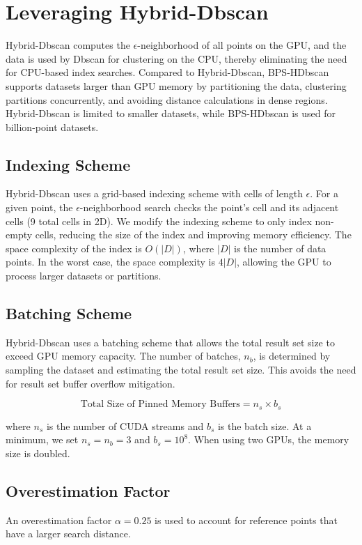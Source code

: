 \documentclass{article}
\begin{document}
\section{Leveraging Hybrid-Dbscan}

Hybrid-Dbscan computes the $\epsilon$-neighborhood of all points on the GPU, and the data is used by Dbscan for clustering on the CPU, thereby eliminating the need for CPU-based index searches. Compared to Hybrid-Dbscan, BPS-HDbscan supports datasets larger than GPU memory by partitioning the data, clustering partitions concurrently, and avoiding distance calculations in dense regions. Hybrid-Dbscan is limited to smaller datasets, while BPS-HDbscan is used for billion-point datasets.

\subsection{Indexing Scheme}
Hybrid-Dbscan uses a grid-based indexing scheme with cells of length $\epsilon$. For a given point, the $\epsilon$-neighborhood search checks the point's cell and its adjacent cells (9 total cells in 2D). We modify the indexing scheme to only index non-empty cells, reducing the size of the index and improving memory efficiency. The space complexity of the index is \(O(|D|)\), where \(|D|\) is the number of data points. In the worst case, the space complexity is \(4|D|\), allowing the GPU to process larger datasets or partitions.

\subsection{Batching Scheme}
Hybrid-Dbscan uses a batching scheme that allows the total result set size to exceed GPU memory capacity. The number of batches, \(n_b\), is determined by sampling the dataset and estimating the total result set size. This avoids the need for result set buffer overflow mitigation.

\[
\text{Total Size of Pinned Memory Buffers} = n_s \times b_s
\]

where \(n_s\) is the number of CUDA streams and \(b_s\) is the batch size. At a minimum, we set \(n_s = n_b = 3\) and \(b_s = 10^8\). When using two GPUs, the memory size is doubled.

\subsection{Overestimation Factor}
An overestimation factor \(\alpha = 0.25\) is used to account for reference points that have a larger search distance.
\end{document}
